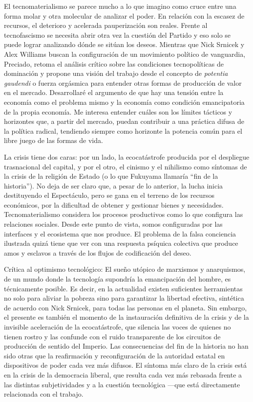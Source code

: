 El tecnomaterialismo se parece mucho a lo que imagino como cruce entre una forma molar y otra molecular de analizar el poder. En relación con la escasez de recursos, el deterioro y acelerada pauperización son reales. Frente al tecnofascismo se necesita abrir otra vez la cuestión del Partido y eso solo se puede lograr analizando dónde se sitúan los deseos. Mientras que Nick Srnicek y Alex Williams buscan la configuración de un movimiento político de vanguardia, Preciado, retoma el análisis crítico sobre las condiciones tecnopolíticas de dominación y propone una visión del trabajo desde el concepto de \emph{potentia gaudendi} o fuerza orgásmica para entender otras formas de producción de valor en el mercado. Desarrollaré el argumento de que hay una tensión entre la economía como el problema mismo y la economía como condición emancipatoria de la propia economía. Me interesa entender cuáles son los límites tácticos y horizontes que, a partir del mercado, puedan contribuir a una práctica difusa de la política radical, tendiendo siempre como horizonte la potencia común para el libre juego de las formas de vida.

La crisis tiene dos caras: por un lado, la ecocatástrofe producida por el despliegue trasnacional del capital, y por el otro, el cinismo y el nihilismo como síntomas de la crisis de la religión de Estado (o lo que Fukuyama llamaría \enquote{fin de la historia}). No deja de ser claro que, a pesar de lo anterior, la lucha inicia destituyendo el Espectáculo, pero se gana en el terreno de los recursos económicos, por la dificultad de obtener y gestionar bienes y necesidades. Tecnomaterialismo considera los procesos productivos como lo que configura las relaciones sociales. Desde este punto de vista, somos configuradas por las interfaces y el ecosistema que nos produce. El problema de la falsa conciencia ilustrada quizá tiene que ver con una respuesta psíquica colectiva que produce amos y esclavos a través de los flujos de codificación del deseo.

Crítica al optimismo tecnológico: El sueño utópico de marxismos y anarquismos, de un mundo donde la tecnología supondría la emancipación del hombre, es técnicamente posible. Es decir, en la actualidad existen suficientes herramientas no solo para aliviar la pobreza sino para garantizar la libertad efectiva, sintética de acuerdo con Nick Srnicek, para todas las personas en el planeta. Sin embargo, el presente es también el momento de la instauración definitiva de la crisis y de la invisible aceleración de la ecocatástrofe, que silencia las voces de quienes no tienen rostro y las confunde con el ruido transparente de los circuitos de producción de sentido del Imperio. Las consecuencias del fin de la historia no han sido otras que la reafirmación y reconfiguración de la autoridad estatal en dispositivos de poder cada vez más difusos. El síntoma más claro de la crisis está en la crisis de la democracia liberal, que resulta cada vez más rebasada frente a las distintas subjetividades y a la cuestión tecnológica ---que está directamente relacionada con el trabajo.

